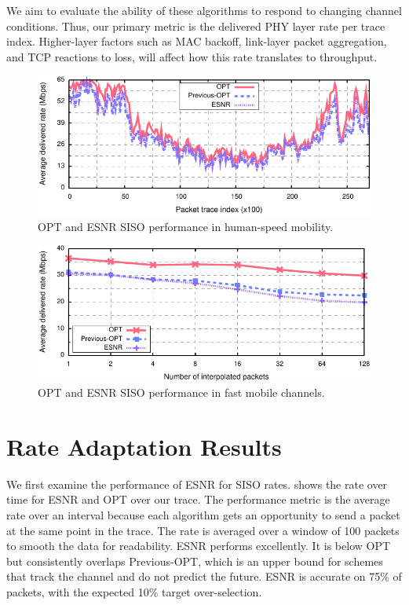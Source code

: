 We aim to evaluate the ability of these algorithms to respond to changing channel conditions. Thus, our primary metric is the delivered PHY layer rate per trace index. Higher-layer factors such as MAC backoff, link-layer packet aggregation, and TCP reactions to loss, will affect how this rate translates to throughput.

\begin{figure}[t]
      \centering
      \includegraphics[width=\textwidth]{figures/rate/siso_rate_time_opt_eff.pdf}
      \caption{\label{fig:siso_rate_time_opt_eff} OPT and ESNR SISO performance in human-speed mobility.}
\end{figure}

\begin{figure}[t]
      \centering
      \includegraphics[width=\textwidth]{figures/rate/siso_rate_skip_opt_eff.pdf}
      \caption{\label{fig:siso_rate_skip_opt_eff} OPT and ESNR SISO performance in fast mobile channels.}
\end{figure}



\section{Rate Adaptation Results}
 We first examine the performance of ESNR for SISO rates.  shows the rate over time for ESNR and OPT over our trace. The performance metric is the average rate over an interval because each algorithm gets an opportunity to send a packet at the same point in the trace. The rate is averaged over a window of 100 packets to smooth the data for readability. ESNR performs excellently. It is below OPT but consistently overlaps Previous-OPT, which is an upper bound for schemes that track the channel and do not predict the future. ESNR is accurate on 75\% of packets, with the expected 10\% target over-selection.

